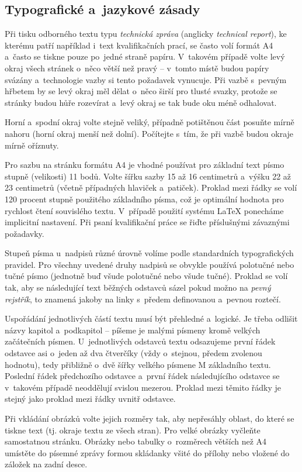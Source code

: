 \begin{itemize}
\chapter{Typografické a~jazykové zásady}
Při tisku odborného textu typu {\it technická zpráva} (anglicky {\it technical report}), ke kterému patří například i~text kvalifikačních prací, se často volí formát A4 a~často se tiskne pouze po~jedné straně papíru. V~takovém případě volte levý okraj všech stránek o~něco větší než pravý -- v~tomto místě budou papíry svázány a~technologie vazby si tento požadavek vynucuje. Při vazbě s~pevným hřbetem by se levý okraj měl dělat o~něco širší pro tlusté svazky, protože se stránky budou hůře rozevírat a~levý okraj se tak bude oku méně odhalovat.

Horní a~spodní okraj volte stejně veliký, případně potištěnou část posuňte mírně nahoru (horní okraj menší než dolní). Počítejte s~tím, že při vazbě budou okraje mírně oříznuty.

Pro sazbu na stránku formátu A4 je vhodné používat pro základní text písmo stupně (velikosti) 11 bodů. Volte šířku sazby 15 až 16 centimetrů a~výšku 22 až 23 centimetrů (včetně případných hlaviček a~patiček). Proklad mezi řádky se volí 120 procent stupně použitého základního písma, což je optimální hodnota pro rychlost čtení souvislého textu. V~případě použití systému LaTeX ponecháme implicitní nastavení. Při psaní kvalifikační práce se řiďte příslušnými závaznými požadavky.

Stupeň písma u~nadpisů různé úrovně volíme podle standardních typografických pravidel. 
Pro všechny uvedené druhy nadpisů se obvykle používá polotučné nebo tučné písmo (jednotně buď všude polotučné nebo všude tučné). Proklad se volí tak, aby se následující text běžných odstavců sázel pokud možno na {\it pevný rejstřík}, to znamená jakoby na linky s~předem definovanou a~pevnou roztečí.

Uspořádání jednotlivých částí textu musí být přehledné a~logické. Je třeba odlišit názvy kapitol a~podkapitol -- píšeme je malými písmeny kromě velkých začátečních písmen. U~jednotlivých odstavců textu odsazujeme první řádek odstavce asi o~jeden až dva čtverčíky (vždy o~stejnou, předem zvolenou hodnotu), tedy přibližně o~dvě šířky velkého písmene M základního textu. Poslední řádek předchozího odstavce a~první řádek následujícího odstavce se v~takovém případě neoddělují svislou mezerou. Proklad mezi těmito řádky je stejný jako proklad mezi řádky uvnitř odstavce.

Při vkládání obrázků volte jejich rozměry tak, aby nepřesáhly oblast, do které se tiskne text (tj. okraje textu ze všech stran). Pro velké obrázky vyčleňte samostatnou stránku. Obrázky nebo tabulky o~rozměrech větších než A4 umístěte do písemné zprávy formou skládanky všité do přílohy nebo vložené do záložek na zadní desce.


\end{itemize}
